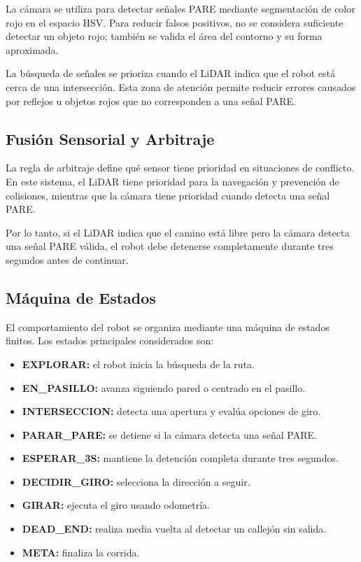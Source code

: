 \documentclass[conference]{IEEEtran}
\begin{document}
La cámara se utiliza para detectar señales PARE mediante segmentación de color rojo en el espacio HSV. Para reducir falsos positivos, no se considera suficiente detectar un objeto rojo; también se valida el área del contorno y su forma aproximada.

La búsqueda de señales se prioriza cuando el LiDAR indica que el robot está cerca de una intersección. Esta zona de atención permite reducir errores causados por reflejos u objetos rojos que no corresponden a una señal PARE.

\subsection{Fusión Sensorial y Arbitraje}

La regla de arbitraje define qué sensor tiene prioridad en situaciones de conflicto. En este sistema, el LiDAR tiene prioridad para la navegación y prevención de colisiones, mientras que la cámara tiene prioridad cuando detecta una señal PARE.

Por lo tanto, si el LiDAR indica que el camino está libre pero la cámara detecta una señal PARE válida, el robot debe detenerse completamente durante tres segundos antes de continuar.

\subsection{Máquina de Estados}

El comportamiento del robot se organiza mediante una máquina de estados finitos. Los estados principales considerados son:

\begin{itemize}
    \item \textbf{EXPLORAR:} el robot inicia la búsqueda de la ruta.
    \item \textbf{EN\_PASILLO:} avanza siguiendo pared o centrado en el pasillo.
    \item \textbf{INTERSECCION:} detecta una apertura y evalúa opciones de giro.
    \item \textbf{PARAR\_PARE:} se detiene si la cámara detecta una señal PARE.
    \item \textbf{ESPERAR\_3S:} mantiene la detención completa durante tres segundos.
    \item \textbf{DECIDIR\_GIRO:} selecciona la dirección a seguir.
    \item \textbf{GIRAR:} ejecuta el giro usando odometría.
    \item \textbf{DEAD\_END:} realiza media vuelta al detectar un callejón sin salida.
    \item \textbf{META:} finaliza la corrida.
\end{itemize}
\end{document}
